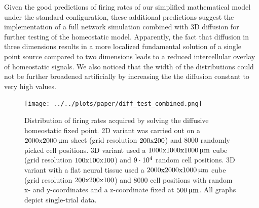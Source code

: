 \documentclass[10pt,letterpaper]{article}
\begin{document}
Given the good predictions of firing rates of our simplified mathematical model under the standard configuration, these additional predictions suggest the implementation of a full network simulation combined with 3D diffusion for further testing of the homeostatic model. Apparently, the fact that diffusion in three dimensions results in a more localized fundamental solution of a single point source compared to two dimensions leads to a reduced intercellular overlay of homeostatic signals. We also noticed that the width of the distributions could not be further broadened artificially by increasing the the diffusion constant to very high values.
\begin{figure}
\texttt{[image: ../../plots/paper/diff\_test\_combined.png]}
\caption{Distribution of firing rates acquired by solving the diffusive homeostatic fixed point. 2D variant was carried out on a $\rm 2000x2000\, \upmu m$ sheet (grid resolution $\rm 200x200$) and $8000$ randomly picked cell positions. 3D variant used a $\rm 1000x1000x1000\, \upmu m$ cube (grid resolution $\rm 100x100x100$) and $\rm 9\cdot 10^4$ random cell positions. 3D variant with a flat neural tissue used a $\rm 2000x2000x1000\, \upmu m$ cube (grid resolution $\rm 200x200x100$) and $8000$ cell positions with random x- and y-coordinates and a z-coordinate fixed at $\rm 500\, \upmu m$. All graphs depict single-trial data.}
\label{Large_Diff_Test}
\end{figure}
\end{document}
